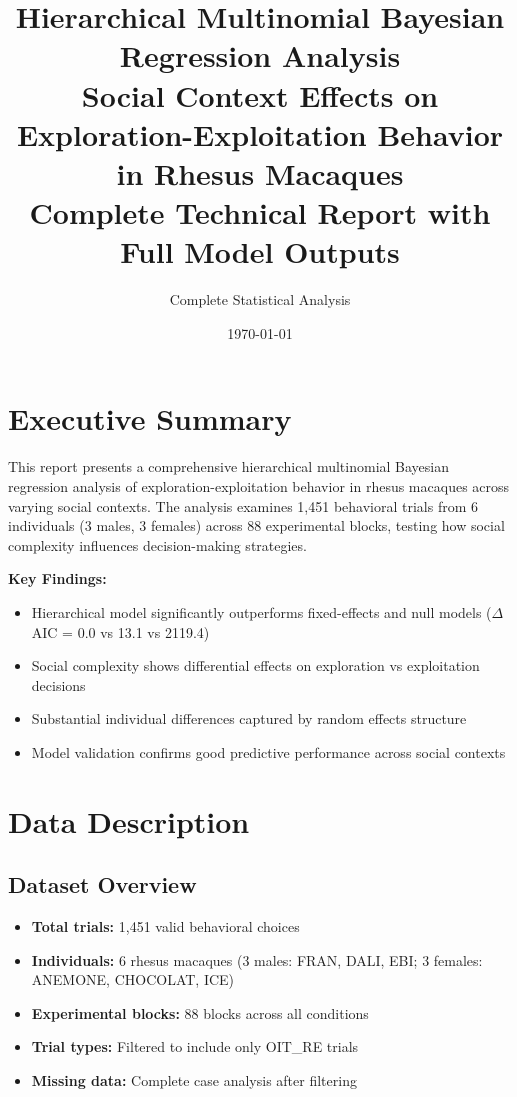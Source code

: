 \documentclass[11pt,a4paper]{article}
\title{\textbf{Hierarchical Multinomial Bayesian Regression Analysis} \\ 
\large Social Context Effects on Exploration-Exploitation Behavior in Rhesus Macaques \\ 
\normalsize Complete Technical Report with Full Model Outputs}
\author{Complete Statistical Analysis}
\date{\today}
\begin{document}
\maketitle

\tableofcontents
\newpage

\section{Executive Summary}

This report presents a comprehensive hierarchical multinomial Bayesian regression analysis of exploration-exploitation behavior in rhesus macaques across varying social contexts. The analysis examines 1,451 behavioral trials from 6 individuals (3 males, 3 females) across 88 experimental blocks, testing how social complexity influences decision-making strategies.

\textbf{Key Findings:}
\begin{itemize}
\item Hierarchical model significantly outperforms fixed-effects and null models ($\Delta$AIC = 0.0 vs 13.1 vs 2119.4)
\item Social complexity shows differential effects on exploration vs exploitation decisions
\item Substantial individual differences captured by random effects structure
\item Model validation confirms good predictive performance across social contexts
\end{itemize}

\section{Data Description}

\subsection{Dataset Overview}
\begin{itemize}
\item \textbf{Total trials:} 1,451 valid behavioral choices
\item \textbf{Individuals:} 6 rhesus macaques (3 males: FRAN, DALI, EBI; 3 females: ANEMONE, CHOCOLAT, ICE)
\item \textbf{Experimental blocks:} 88 blocks across all conditions
\item \textbf{Trial types:} Filtered to include only OIT\_RE trials
\item \textbf{Missing data:} Complete case analysis after filtering
\end{itemize}
\end{document}

